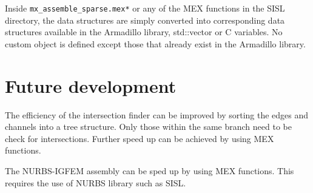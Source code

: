 \documentclass[11pt,letterpaper]{article}
\begin{document}
Inside \texttt{mx\_assemble\_sparse.mex*} or any of the MEX functions in the SISL directory, the data structures are simply converted into corresponding data structures available in the Armadillo library, std::vector or C variables.  No custom object is defined except those that already exist in the Armadillo library. 

\section{Future development}
The efficiency of the intersection finder can be improved by sorting the edges and channels into a tree structure. Only those within the same branch need to be check for intersections. Further speed up can be achieved by using MEX functions. 

The NURBS-IGFEM assembly can be sped up by using MEX functions. This requires the use of NURBS library such as SISL.

\FloatBarrier    
\end{document}
